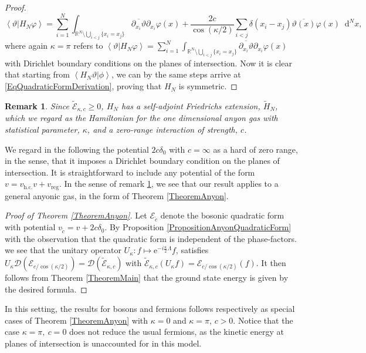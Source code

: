 \documentclass[a4paper,11pt]{article}
\newcommand{\euler}[1]{\text{e}^{#1}}
\newcommand{\dom}[1]{\mathcal D\left(#1\right)}
\renewcommand{\braket}[1]{\left\langle#1\right\rangle}
\newcommand*\diff{\mathop{}\!\mathrm{d}}
\newcommand{\R}{\mathbb{R}}
\newtheorem{remark}[theorem]{Remark}
\numberwithin{equation}{section}
\begin{document}
\begin{proof}
\begin{equation}
				\braket{\vartheta\vert H_N \varphi}=\sum_{i=1}^{N}\int_{{\R^N\setminus\bigcup_{i<j}\{x_i=x_j\}}}\overline{\partial_{x_i}\vartheta} \partial_{x_i}\varphi(x)+\frac{2c}{\cos(\kappa/2)}\sum_{i<j} \delta(x_i-x_j)\overline{\vartheta(x)}\varphi(x)\diff^{N}x,
				\end{equation}
				where again $ \kappa=\pi $ refers to $ \braket{\vartheta\vert H_N \varphi}=\sum_{i=1}^{N}\int_{{\R^N\setminus\bigcup_{i<j}\{x_i=x_j\}}}\overline{\partial_{x_i}\vartheta} \partial_{x_i}\varphi(x) $ with Dirichlet boundary conditions on the planes of intersection.
				Now it is clear that starting from $ \braket{H_N\vartheta\vert \phi} $, we can by the same steps arrive at \eqref{EqQuadraticFormDerivation}, proving that $ H_N $ is symmetric. 	
			\end{proof}
			\begin{remark}\label{RemarkAnyons}
				Since $ \tilde{\mathcal{E}}_{\kappa,c}\geq0 $, $ H_N $ has a self-adjoint Friedrichs extension, $ \tilde{H}_N $, which we regard as the Hamiltonian for the one dimensional anyon gas with statistical parameter, $ \kappa $, and a zero-range interaction of strength, $ c $.
			\end{remark}
			We regard in the following the potential $ 2c\delta_0 $ with $ c=\infty $ as a hard of zero range, in the sense, that it imposes a Dirichlet boundary condition on the planes of intersection. It is straightforward to include any potential of the form $ v=v_{\text{h.c.}}v+v_{\text{reg}} $.
			In the sense of remark \ref{RemarkAnyons}, we see that our result applies to a general anyonic gas, in the form of Theorem \ref{TheoremAnyon}.
			\begin{proof}[Proof of Theorem \ref{TheoremAnyon}]
				Let $ \mathcal{E}_{\tilde{c}} $ denote the bosonic quadratic form with potential $ v_{\tilde{c}}=v+2c\delta_0 $. By Proposition \ref{PropositionAnyonQuadraticForm} with the observation that the quadratic form is independent of the phase-factors. we see that the unitary operator $ U_\kappa: f\mapsto \euler{-i\frac{\kappa}{2}\Lambda}f $, satisfies $ U_\kappa\dom{\mathcal{E}_{c/\cos(\kappa/2)}}=\dom{\tilde{\mathcal{E}}_{\kappa,c}} $ with $ \tilde{\mathcal{E}}_{\kappa,c}(U_\kappa f)=\mathcal{E}_{c/\cos(\kappa/2)}(f) $. It then follows from Theorem \ref{TheoremMain} that the ground state energy is given by the desired formula.
			\end{proof}
			In this setting, the results for bosons and fermions follows respectively as special cases of Theorem \ref{TheoremAnyon} with $ \kappa=0 $ and $ \kappa=\pi $, $ c>0 $. Notice that the case $ \kappa=\pi,\ c=0 $ does not reduce the usual fermions, as the kinetic energy at planes of intersection is unaccounted for in this model.
\end{document}
